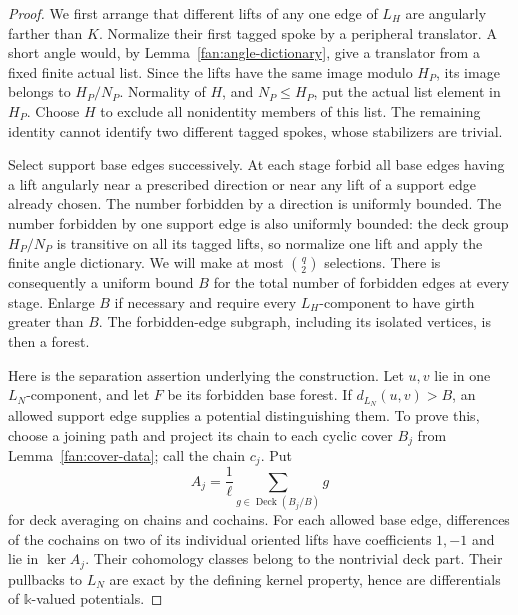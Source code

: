 \begin{proof}
We first arrange that different lifts of any one edge of $L_H$ are
angularly farther than $K$.  Normalize their first tagged spoke by a
peripheral translator.  A short angle would, by
Lemma~\ref{fan:angle-dictionary}, give a translator from a fixed finite
actual list.  Since the lifts have the same image modulo $H_P$, its
image belongs to $H_P/N_P$.  Normality of $H$, and $N_P\le H_P$, put
the actual list element in $H_P$.  Choose $H$ to exclude all nonidentity
members of this list.  The remaining identity cannot identify two
different tagged spokes, whose stabilizers are trivial.

Select support base edges successively.  At each stage forbid all
base edges having a lift angularly near a prescribed direction or
near any lift of a support edge already chosen.  The number forbidden
by a direction is uniformly bounded.  The number forbidden by one
support edge is also uniformly bounded: the deck group $H_P/N_P$ is
transitive on all its tagged lifts, so normalize one lift and apply
the finite angle dictionary.  We will make at most $\binom q2$
selections.  There is consequently a uniform bound $B$ for the total
number of forbidden edges at every stage.  Enlarge $B$ if necessary
and require every $L_H$-component to have girth greater than $B$.
The forbidden-edge subgraph, including its isolated vertices, is then
a forest.

Here is the separation assertion underlying the construction.  Let
$u,v$ lie in one $L_N$-component, and let $F$ be its forbidden base
forest.  If $d_{L_N}(u,v)>B$, an allowed support edge supplies a
potential distinguishing them.  To prove this, choose a joining path
and project its chain to each cyclic cover $B_j$ from
Lemma~\ref{fan:cover-data}; call the chain $c_j$.  Put
\[
 A_j=\frac1\ell\sum_{g\in\operatorname{Deck}(B_j/B)}g
\]
for deck averaging on chains and cochains.  For each allowed base edge,
differences of the cochains on two of its individual oriented lifts
have coefficients $1,-1$ and lie in $\ker A_j$.  Their cohomology
classes belong to the nontrivial deck part.  Their pullbacks to $L_N$
are exact by the defining kernel property, hence are differentials
of $\mathbb k$-valued potentials.


\end{proof}
